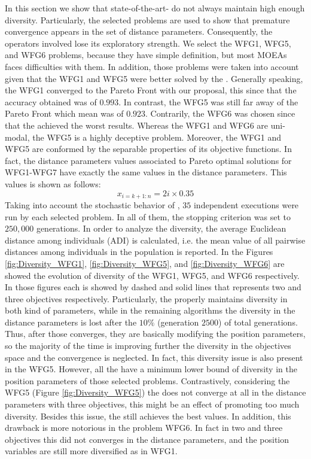 In this section we show that state-of-the-art-\MOEAS{} do not always maintain high enough diversity.
%
Particularly, the selected problems are used to show that premature convergence appears in the set of distance parameters.
%
Consequently, the operators involved lose its exploratory strength.
%
We select the WFG1, WFG5, and WFG6 problems, because they have simple definition, but most MOEAs faces difficulties with them. 
%
In addition, those problems were taken into account given that the WFG1 and WFG5 were better solved by the \VSDMOEA{}.
%
Generally speaking, the WFG1 converged to the Pareto Front with our proposal, this since that the accuracy obtained was of $0.993$.
%
In contrast, the WFG5 was still far away of the Pareto Front which \HV{} mean  was of $0.923$.
%
Contrarily, the WFG6 was chosen since that the \VSDMOEA{} achieved the worst results.
%
Whereas the WFG1 and WFG6 are uni-modal, the WFG5 is a highly deceptive problem.
%
Moreover, the WFG1 and WFG5 are conformed by the separable properties of its objective functions.
%
In fact, the distance parameters values associated to Pareto optimal solutions for WFG1-WFG7 have exactly the same values in the distance parameters.
%
This values is shown as follows:
\begin{equation}
   x_{i=k+1:n} = 2i \times 0.35
\end{equation}
%
Taking into account the stochastic behavior of \MOEAS{}, $35$ independent executions were run by each selected problem.
%
In all of them, the stopping criterion was set to $250,000$ generations.
%
In order to analyze the diversity, the average Euclidean distance among individuals (ADI) is calculated, i.e. the mean value of all pairwise distances among individuals in the population is reported.
%
In the Figures \ref{fig:Diversity_WFG1}, \ref{fig:Diversity_WFG5}, and \ref{fig:Diversity_WFG6} are showed the evolution of diversity of the WFG1, WFG5, and WFG6 respectively.
%
In those figures each \MOEA{} is showed by dashed and solid lines that represents two and three objectives respectively.
%
Particularly, the \VSDMOEA{} properly maintains diversity in both kind of parameters, while in the remaining algorithms the diversity in the distance parameters is lost after the $10\%$ (generation $2500$) of total generations.
%
Thus, after those \MOEAS{} converges, they are basically modifying the position parameters, so the majority of the time is improving further the diversity in the objectives space and the convergence is neglected.
%
In fact, this diversity issue is also present in the WFG5.
%
However, all the \MOEAS{} have a minimum lower bound of diversity in the position parameters of those selected problems.
%
Contrastively, considering the WFG5 (Figure \ref{fig:Diversity_WFG5}) the \VSDMOEA{} does not converge at all in the distance parameters with three objectives, this might be an effect of promoting too much diversity.
%
Besides this issue, the \VSDMOEA{} still achieves the best \HV{} values.
%
In addition, this drawback is more notorious in the problem WFG6.
%
In fact in two and three objectives this \MOEA{} did not converges in the distance parameters, and the position variables are still more diversified as in WFG1.


